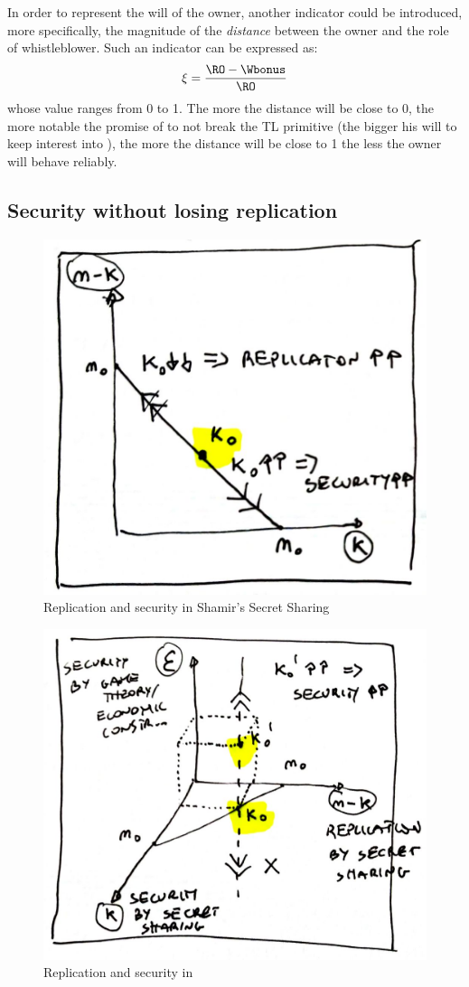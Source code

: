 In order to represent the will of the owner, another indicator could be introduced, more specifically, the magnitude of the {\em distance} between the owner and the role of whistleblower. Such an indicator can be expressed as:
\begin{equation}\label{proprel3}
\xi = \frac{\RO - \Wbonus}{\RO}
\end{equation} 
whose value ranges from 0 to 1. The more the distance will be close to 0, the more notable the promise of \owner to not break the TL primitive (the bigger his will to keep interest into \secret), the more the distance will be close to 1 the less the owner will behave reliably. 


\subsection{Security without losing replication}

\begin{figure}[t]
	\centering
	\includegraphics[width=.6\columnwidth]{fig/rse_a}
	\caption{Replication and security in Shamir's Secret Sharing}
	\label{fig:rsea}
\end{figure}

\begin{figure}[t]
	\centering
	\includegraphics[width=.65\columnwidth]{fig/rse_b}
	\caption{Replication and security in \shortname}
	\label{fig:rseb}
\end{figure}

